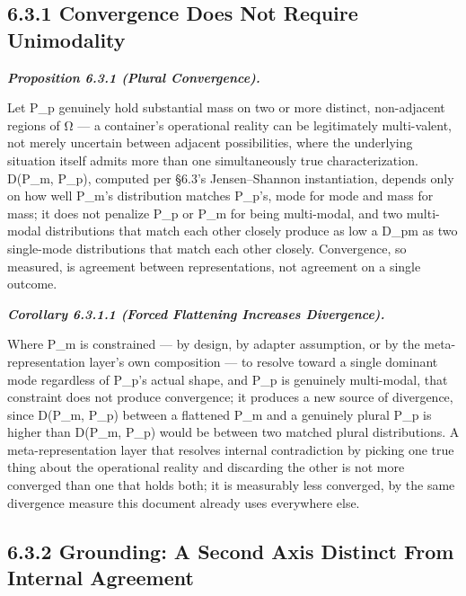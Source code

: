 \documentclass[
]{article}
\begin{document}
\hypertarget{convergence-does-not-require-unimodality}{%
\subsection{6.3.1 Convergence Does Not Require
Unimodality}\label{convergence-does-not-require-unimodality}}

\emph{\textbf{Proposition 6.3.1 (Plural Convergence).}}

Let P\_p genuinely hold substantial mass on two or more distinct,
non-adjacent regions of Ω --- a container's operational reality can be
legitimately multi-valent, not merely uncertain between adjacent
possibilities, where the underlying situation itself admits more than
one simultaneously true characterization. D(P\_m, P\_p), computed per
§6.3's Jensen--Shannon instantiation, depends only on how well P\_m's
distribution matches P\_p's, mode for mode and mass for mass; it does
not penalize P\_p or P\_m for being multi-modal, and two multi-modal
distributions that match each other closely produce as low a D\_pm as
two single-mode distributions that match each other closely.
Convergence, so measured, is agreement between representations, not
agreement on a single outcome.

\emph{\textbf{Corollary 6.3.1.1 (Forced Flattening Increases
Divergence).}}

Where P\_m is constrained --- by design, by adapter assumption, or by
the meta-representation layer's own composition --- to resolve toward a
single dominant mode regardless of P\_p's actual shape, and P\_p is
genuinely multi-modal, that constraint does not produce convergence; it
produces a new source of divergence, since D(P\_m, P\_p) between a
flattened P\_m and a genuinely plural P\_p is higher than D(P\_m, P\_p)
would be between two matched plural distributions. A meta-representation
layer that resolves internal contradiction by picking one true thing
about the operational reality and discarding the other is not more
converged than one that holds both; it is measurably less converged, by
the same divergence measure this document already uses everywhere else.

\hypertarget{grounding-a-second-axis-distinct-from-internal-agreement}{%
\subsection{6.3.2 Grounding: A Second Axis Distinct From Internal
Agreement}\label{grounding-a-second-axis-distinct-from-internal-agreement}}
\end{document}
